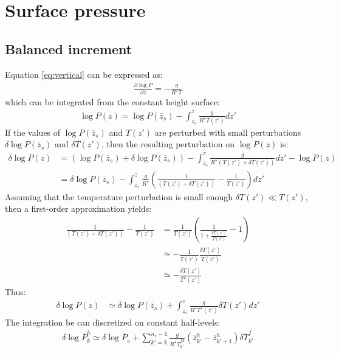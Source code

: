 \documentclass[12pt]{scrartcl}
\begin{document}
\section{Surface pressure}

\subsection{Balanced increment}

Equation \eqref{eq:vertical} can be expressed as:
\begin{align}
\label{eq:vertical_log}
\frac{\partial \log P}{\partial z} = -\frac{g}{R^\star T}
\end{align}
which can be integrated from the constant height surface:
\begin{align}
\log P(z) = \log P(\overline{z}_s) - \int_{\overline{z}_s}^{z} \frac{g}{R^\star T(z')} d z'
\end{align}
If the values of $\log P(\overline{z}_s)$ and $T(z')$ are perturbed with small perturbations $\delta \log P(\overline{z}_s)$ and $\delta T(z')$, then the resulting perturbation on $\log P(z)$ is:
\begin{align}
\delta \log P(z) & = \left(\log P(\overline{z}_s) + \delta \log P(\overline{z}_s)\right) - \int_{\overline{z}_s}^{z} \frac{g}{R^\star \left(T(z')+\delta T(z')\right)} d z' - \log P(z) \nonumber \\
& = \delta \log P(\overline{z}_s) - \int_{\overline{z}_s}^{z} \frac{g}{R^\star} \left(\frac{1}{\left(T(z')+\delta T(z')\right)} - \frac{1}{T(z')}\right) d z'
\end{align}
Assuming that the temperature perturbation is small enough $\delta T(z') \ll T(z')$, then a first-order approximation yields:
\begin{align}
\frac{1}{\left(T(z')+\delta T(z')\right)} - \frac{1}{T(z')} & = \frac{1}{T(z')} \left(\frac{1}{1 + \frac{\delta T(z')}{T(z')}}-1\right) \nonumber \\
 & \simeq -\frac{1}{T(z')} \frac{\delta T(z')}{T(z')} \nonumber \\
& \simeq -\frac{\delta T(z')}{T^2(z')}
\end{align}
Thus:
\begin{align}
\delta \log P(z) & \simeq \delta \log P(\overline{z}_s) + \int_{\overline{z}_s}^{z} \frac{g}{R^\star T^2(z')} \delta T(z') d z'
\end{align}
The integration be can discretized on constant half-levels:
\begin{align}
\delta \log \overline{P}^h_{k} \simeq \delta \log \overline{P}_s + \sum_{k'=k}^{n_s-1} \frac{g}{R^\star \overline{T}^{f2}_{k'}} \left(\overline{z}^h_{k'} - \overline{z}^h_{k'+1}\right) \delta \overline{T}^f_{k'}
\end{align}
\end{document}
